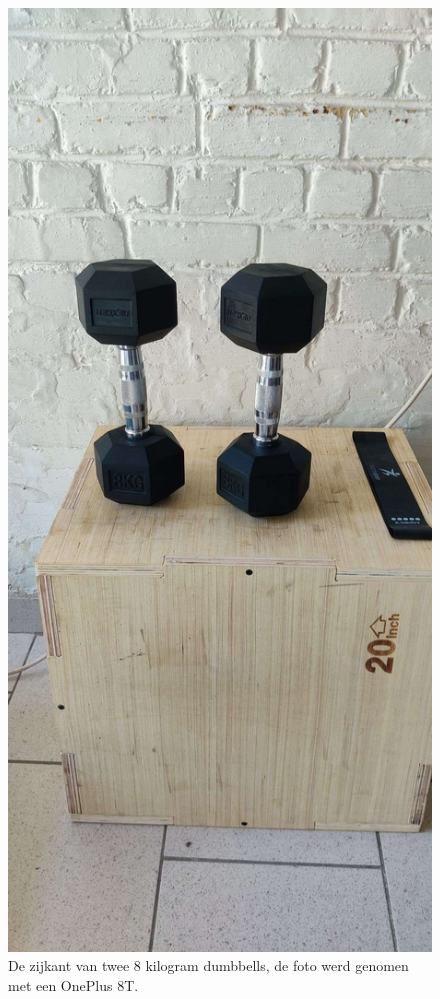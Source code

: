 \begin{figure}[H]
    \begin{center}
        \includegraphics[scale=0.1]{images/prompt2-image}
        \caption{De zijkant van twee 8 kilogram dumbbells, de foto werd genomen met een OnePlus 8T.}
        \label{fig:test-twee}
    \end{center}
\end{figure}

